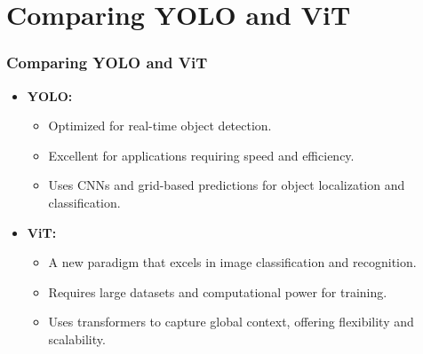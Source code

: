 \documentclass{beamer}
\begin{document}

\section{Comparing YOLO and ViT}
\begin{frame}
\frametitle{Comparing YOLO and ViT}
\begin{itemize}
    \item \textbf{YOLO:}
        \begin{itemize}
            \item Optimized for real-time object detection.
            \item Excellent for applications requiring speed and efficiency.
            \item Uses CNNs and grid-based predictions for object localization and classification.
        \end{itemize}
    \item \textbf{ViT:}
        \begin{itemize}
            \item A new paradigm that excels in image classification and recognition.
            \item Requires large datasets and computational power for training.
            \item Uses transformers to capture global context, offering flexibility and scalability.
        \end{itemize}
\end{itemize}
\end{frame}

\end{document}
